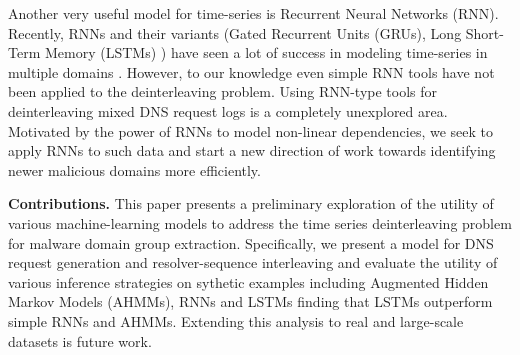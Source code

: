 	Another very useful model for time-series is Recurrent Neural Networks
	(RNN).  Recently, RNNs and their variants (Gated Recurrent Units
	(GRUs)\cite{chung2014empirical}, Long Short-Term Memory
	(LSTMs) \cite{Hochreiter}) have seen a lot of success in modeling
	time-series in multiple domains \cite{bahdanau2014neural,
		NIPS2008_3449, sutskever2014sequence}.  However, to our knowledge even
	simple RNN tools have not been applied to the deinterleaving
	problem. Using RNN-type tools for deinterleaving mixed DNS request
	logs is a completely unexplored area.  Motivated by the power of RNNs
	to model non-linear dependencies, we seek to apply RNNs to such data
	and start a new direction of work towards identifying newer malicious
	domains more efficiently.
	
{\bf
        Contributions. } This paper presents a preliminary exploration
          of the utility of various machine-learning models to address
          the time series deinterleaving problem for malware domain
          group extraction.  Specifically, we present a model for DNS
          request generation and resolver-sequence interleaving and
          evaluate the utility of various inference strategies on
          sythetic examples including Augmented Hidden Markov Models
          (AHMMs), RNNs and LSTMs finding that LSTMs outperform simple
          RNNs and AHMMs.  Extending this analysis to real and
          large-scale datasets is future work.
